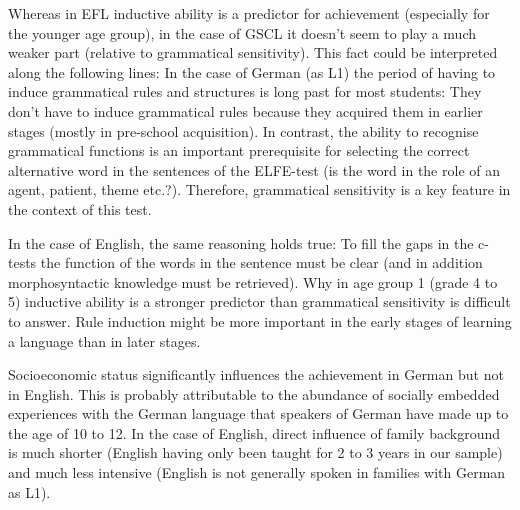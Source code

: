 \documentclass[output=paper]{langsci/langscibook}
\begin{document}
Whereas in EFL inductive ability is a predictor for achievement (especially for the younger age group), in the case of GSCL it doesn’t seem to play a much weaker part (relative to grammatical sensitivity). This fact could be interpreted along the following lines: In the case of German (as L1) the period of having to induce grammatical rules and structures is long past for most students: They don’t have to induce grammatical rules because they acquired them in earlier stages (mostly in pre-school acquisition). In contrast, the ability to recognise grammatical functions is an important prerequisite for selecting the correct alternative word in the sentences of the ELFE-test (is the word in the role of an agent, patient, theme etc.?). Therefore, grammatical sensitivity is a key feature in the context of this test.

In the case of English, the same reasoning holds true: To fill the gaps in the c-tests the function of the words in the sentence must be clear (and in addition morphosyntactic knowledge must be retrieved). Why in age group 1 (grade 4 to 5) inductive ability is a stronger predictor than grammatical sensitivity is difficult to answer. Rule induction might be more important in the early stages of learning a language than in later stages.

Socioeconomic status significantly influences the achievement in German but not in English. This is probably attributable to the abundance of socially embedded experiences with the German language that speakers of German have made up to the age of 10 to 12. In the case of English, direct influence of family background is much shorter (English having only been taught for 2 to 3 years in our sample) and much less intensive (English is not generally spoken in families with German as L1). 
\end{document}
